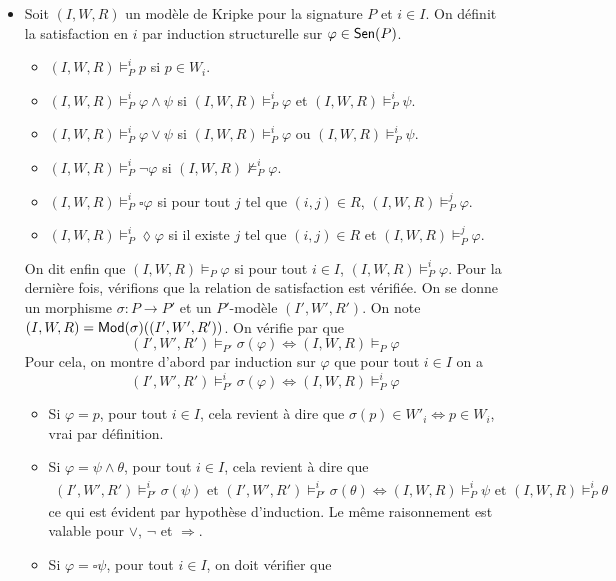 \documentclass[11pt,a4paper]{report}
\newcommand{\ph}{\varphi}
\newcommand{\itemz}{\item[$\triangleright$]}
\renewcommand{\iff}{\Leftrightarrow}
\newcommand{\info}[1]{\text{{\fontfamily{lmss}\selectfont #1}}}
\newcommand{\Mod}{\info{Mod}}
\newcommand{\Sen}{\info{Sen}}
\newcommand{\1}{\mathbbm{1}}
\begin{document}
\begin{itemize}
\itemz Soit $(I,W,R)$ un modèle de Kripke pour la signature $P$ et $i \in I$. On définit la satisfaction en $i$ par induction structurelle sur $\ph \in \Sen(P)$.
\begin{itemize}
\setlength\itemsep{-0.3em}
\item $(I,W,R) \models^i_P p$ si $p \in W_i$.
\item $(I,W,R) \models^i_P \ph \wedge \psi$ si $(I,W,R) \models^i_P \ph$ et $(I,W,R) \models^i_P \psi$.
\item $(I,W,R) \models^i_P \ph \vee \psi$ si $(I,W,R) \models^i_P \ph$ ou $(I,W,R) \models^i_P \psi$.
\item $(I,W,R) \models^i_P \neg \ph$ si $(I,W,R) \not\models^i_P \ph$.
\item $(I,W,R) \models^i_P \square \ph$ si pour tout $j$ tel que $(i,j) \in R$, $(I,W,R) \models^j_P \ph$.
\item $(I,W,R) \models^i_P \lozenge \ph$ si il existe $j$ tel que $(i,j) \in R$ et $(I,W,R) \models^j_P \ph$.
\end{itemize}
On dit enfin que $(I,W,R) \models_P \ph$ si pour tout $i \in I$, $(I,W,R) \models^i_P \ph$. Pour la dernière fois, vérifions que la relation de satisfaction est vérifiée. On se donne un morphisme $\sigma : P \to P'$ et un $P'$-modèle $(I',W',R')$. On note $(I,W,R) = \Mod(\sigma)((I',W',R'))$. On vérifie par que 
\[ (I',W',R') \models_{P'} \sigma(\ph) \iff (I,W,R) \models_P \ph \]
Pour cela, on montre d'abord par induction sur $\ph$ que pour tout $i \in I$ on a 
\begin{equation} (I',W',R') \models^i_{P'} \sigma(\ph) \iff (I,W,R) \models^i_P \ph \label{mplsat} \end{equation} 
\begin{itemize}
\setlength\itemsep{-0.3em}
\item Si $\ph = p$, pour tout $i \in I$, cela revient à dire que $\sigma(p) \in W'_i \iff p \in W_i$, vrai par définition.
\item Si $\ph = \psi \wedge \theta$, pour tout $i \in I$, cela revient à dire que 
\begin{align*} (I',W',R') \models^i_{P'} \sigma(\psi) \text{ et } (I',W',R') \models^i_{P'} \sigma(\theta) \iff (I,W,R) \models^i_P \psi \text{ et } (I,W,R) \models^i_P \theta
\end{align*}
ce qui est évident par hypothèse d'induction. Le même raisonnement est valable pour $\vee$, $\neg$ et $\Rightarrow$.
\item Si $\ph = \square \psi$, pour tout $i \in I$, on doit vérifier que

\end{itemize}
\end{itemize}
\end{document}
